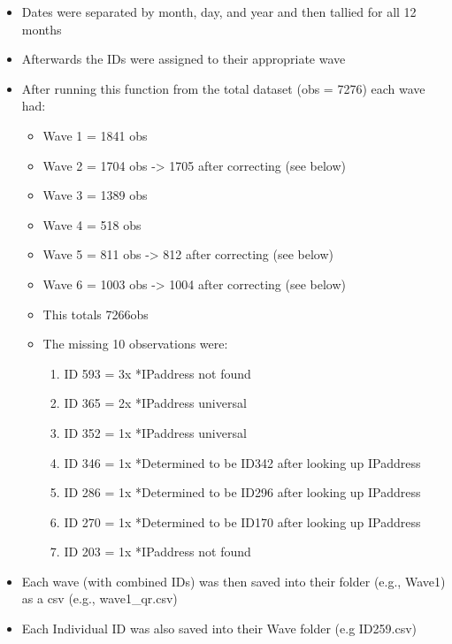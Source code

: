 \documentclass[
]{book}
\providecommand{\tightlist}{%
  \setlength{\itemsep}{0pt}\setlength{\parskip}{0pt}}
\begin{document}
\begin{itemize}
\tightlist
\item
  Dates were separated by month, day, and year and then tallied for all 12 months
\item
  Afterwards the IDs were assigned to their appropriate wave
\item
  After running this function from the total dataset (obs = 7276) each wave had:

  \begin{itemize}
  \tightlist
  \item
    Wave 1 = 1841 obs
  \item
    Wave 2 = 1704 obs -\textgreater{} 1705 after correcting (see below)
  \item
    Wave 3 = 1389 obs
  \item
    Wave 4 = 518 obs
  \item
    Wave 5 = 811 obs -\textgreater{} 812 after correcting (see below)
  \item
    Wave 6 = 1003 obs -\textgreater{} 1004 after correcting (see below)
  \item
    This totals 7266obs
  \item
    The missing 10 observations were:

    \begin{enumerate}
    \def\labelenumi{\arabic{enumi}.}
    \tightlist
    \item
      ID 593 = 3x *IPaddress not found
    \item
      ID 365 = 2x *IPaddress universal
    \item
      ID 352 = 1x *IPaddress universal
    \item
      ID 346 = 1x *Determined to be ID342 after looking up IPaddress
    \item
      ID 286 = 1x *Determined to be ID296 after looking up IPaddress
    \item
      ID 270 = 1x *Determined to be ID170 after looking up IPaddress
    \item
      ID 203 = 1x *IPaddress not found
    \end{enumerate}
  \end{itemize}
\item
  Each wave (with combined IDs) was then saved into their folder (e.g., Wave1) as a csv (e.g., wave1\_qr.csv)
\item
  Each Individual ID was also saved into their Wave folder (e.g ID259.csv)
\end{itemize}
\end{document}
